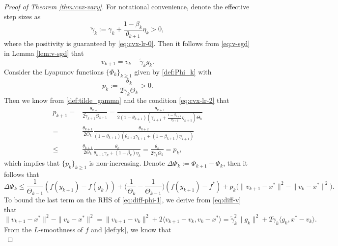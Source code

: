 \documentclass[10pt]{article}
\numberwithin{equation}{section}
\theoremstyle{definition}
\begin{document}
\begin{proof}[Proof of Theorem \ref{thm:cvx-vary}]
For notational convenience, denote the effective step sizes as
\begin{equation}\label{def:tilde_gamma}
    \tilde{\gamma}_k:=\gamma_k+\frac{1-\beta_k}{\theta_{k+1}}\eta_k>0,
\end{equation}
where the positivity is guaranteed by \eqref{eq:cvx-lr-0}. Then it follows from \eqref{eq:v-sgd} in Lemma \ref{lem:v-sgd} that
\begin{equation}\label{eq:diff-v}
    v_{k+1}=v_k- \tilde{\gamma}_k g_k.
\end{equation}
Consider the Lyapunov functions $\{\Phi_k\}_{k\ge 1}$ given by \eqref{def:Phi_k} with 
\begin{equation}\label{def:pk}
   p_k:=\frac{\theta_k}{2\tilde{\gamma}_k\Theta_k}>0.
\end{equation}
Then we know from \eqref{def:tilde_gamma} and the condition \eqref{eq:cvx-lr-2} that
\begin{align*}
    p_{k+1}=&\frac{\theta_{k+1}}{2\tilde{\gamma}_{k+1}\Theta_{k+1}}=\frac{\theta_{k+1}}{2(1-\theta_{k+1})(\gamma_{k+1}+\frac{1-\beta_{k+1}}{\theta_{k+2}}\eta_{k+1})\Theta_k}\\
    =&\frac{\theta_{k+1}}{2\Theta_k}\frac{\theta_{k+2}}{(1-\theta_{k+1})(\theta_{k+2}\gamma_{k+1}+(1-\beta_{k+1})\eta_{k+1})}\\
    \leq & \frac{\theta_{k+1}}{2\Theta_k}\frac{\theta_k}{\theta_{k+1}\gamma_k+(1-\beta_k)\eta_k} = \frac{\theta_k}{2\tilde{\gamma}_k\Theta_k}=p_k,
\end{align*}
which implies that $\{p_k\}_{k\ge 1}$ is non-increasing. Denote $\Delta \Phi_k:=\Phi_{k+1}-\Phi_k$, then it follows that
\begin{equation}\label{eq:diff-phi-1}
\Delta \Phi_k \leq \frac{1}{\Theta_{k-1}}(f(y_{k+1})-f(y_k))+\Big(\frac{1}{\Theta_k}-\frac{1}{\Theta_{k-1}}\Big)(f(y_{k+1})-f^*)+p_k\big(\|v_{k+1}-x^*\|^2-\|v_k-x^*\|^2\big).
\end{equation}
To bound the last term on the RHS of \eqref{eq:diff-phi-1}, we derive from \eqref{eq:diff-v} that 
\begin{equation}\label{eq:diff-v-1}
\|v_{k+1}-x^*\|^2-\|v_k-x^*\|^2=\|v_{k+1}-v_k\|^2+2\langle v_{k+1}-v_k, v_k-x^*\rangle = \tilde{\gamma}_k^2\|g_k\|^2+2 \tilde{\gamma}_k\langle g_k, x^*-v_k\rangle.
\end{equation}
From the $L$-smoothness of $f$ and \eqref{def:yk}, we know that
\begin{equation}\label{eq:f_yt}

\end{equation}
\end{proof}
\end{document}
